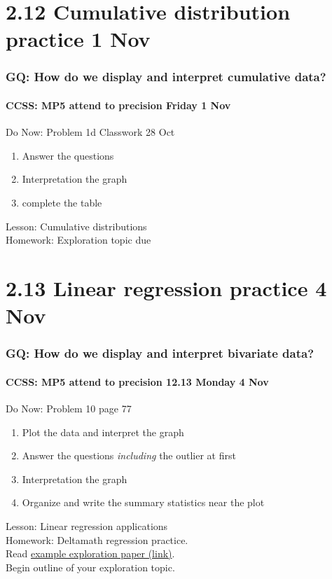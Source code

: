 \documentclass{beamer}
\begin{document}
\section{2.12 Cumulative distribution practice 1 Nov}
\frame
{
  \frametitle{GQ: How do we display and interpret cumulative data?}
  \framesubtitle{CCSS: MP5 attend to precision \hfill \alert{Friday 1 Nov}}

  \begin{block}{Do Now: Problem 1d Classwork 28 Oct}
  \begin{enumerate}
      \item Answer the questions 
      \item Interpretation the graph
      \item complete the table
  \end{enumerate}
  \end{block}
  Lesson: Cumulative distributions\\ \smallskip
  Homework: Exploration topic due
}

\section{2.13 Linear regression practice 4 Nov}
\frame
{
  \frametitle{GQ: How do we display and interpret bivariate data?}
  \framesubtitle{CCSS: MP5 attend to precision \hfill \alert{12.13 Monday 4 Nov}}

  \begin{block}{Do Now: Problem 10 page 77}
  \begin{enumerate}
    \item Plot the data and interpret the graph 
    \item Answer the questions \emph{including} the outlier at first
    \item Interpretation the graph
    \item Organize and write the summary statistics near the plot
  \end{enumerate}
  \end{block}
  Lesson: Linear regression applications\\ \smallskip
  Homework: Deltamath regression practice. \\Read 
  \href{https://docs.google.com/viewer?a=v&pid=sites&srcid=ZGVmYXVsdGRvbWFpbnxodXNvbmJlY2F8Z3g6NzRkYjQ2MzQ5MDNmMDUxMA}
{example exploration paper (link)}. \\Begin outline of your exploration topic. 
}
\end{document}
